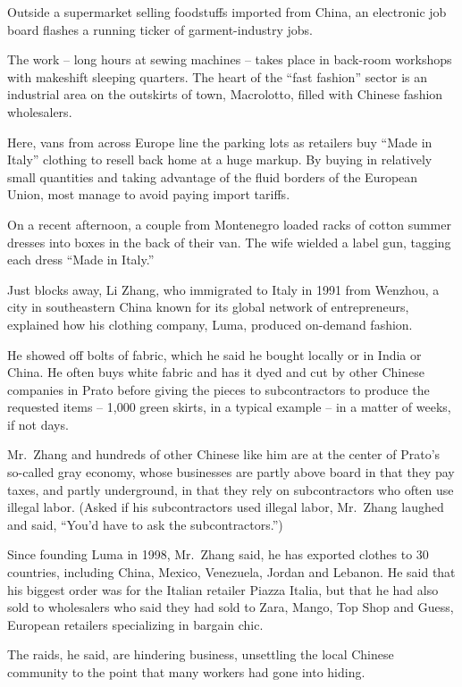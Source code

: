 ﻿\documentclass[12pt]{article}
\begin{document}
Outside a supermarket selling foodstuffs imported from China, an electronic job board flashes a
running ticker of garment-industry jobs.

The work -- long hours at sewing machines -- takes place in back-room workshops with makeshift
sleeping quarters. The heart of the ``fast fashion'' sector is an industrial area on the outskirts
of town, Macrolotto, filled with Chinese fashion wholesalers.

Here, vans from across Europe line the parking lots as retailers buy ``Made in Italy'' clothing to
resell back home at a huge markup. By buying in relatively small quantities and taking advantage of
the fluid borders of the European Union, most manage to avoid paying import tariffs.

On a recent afternoon, a couple from Montenegro loaded racks of cotton summer dresses into boxes in
the back of their van. The wife wielded a label gun, tagging each dress ``Made in Italy.''

Just blocks away, Li Zhang, who immigrated to Italy in 1991 from Wenzhou, a city in southeastern
China known for its global network of entrepreneurs, explained how his clothing company, Luma,
produced on-demand fashion.

He showed off bolts of fabric, which he said he bought locally or in India or China. He often buys
white fabric and has it dyed and cut by other Chinese companies in Prato before giving the pieces to
subcontractors to produce the requested items -- 1,000 green skirts, in a typical example -- in a
matter of weeks, if not days.

Mr.~Zhang and hundreds of other Chinese like him are at the center of Prato's so-called gray
economy, whose businesses are partly above board in that they pay taxes, and partly underground, in
that they rely on subcontractors who often use illegal labor. (Asked if his subcontractors used
illegal labor, Mr.~Zhang laughed and said, ``You'd have to ask the subcontractors.'')

Since founding Luma in 1998, Mr.~Zhang said, he has exported clothes to 30 countries, including
China, Mexico, Venezuela, Jordan and Lebanon. He said that his biggest order was for the Italian
retailer Piazza Italia, but that he had also sold to wholesalers who said they had sold to Zara,
Mango, Top Shop and Guess, European retailers specializing in bargain chic.

The raids, he said, are hindering business, unsettling the local Chinese community to the point that
many workers had gone into hiding.
\end{document}
